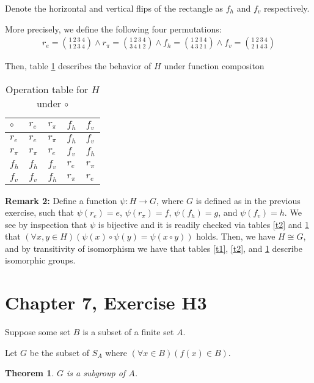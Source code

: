 \documentclass[12pt]{article}
\newtheorem{thm}{Theorem}
\begin{document}
Denote the horizontal and vertical flips
of the rectangle
as $f_h$ and $f_v$ respectively.

More precisely, we define the following four permutations:
\begin{align}
	r_e = \binom{1\ 2\ 3\ 4}{1\ 2\ 3\ 4} \land
	r_\pi = \binom{1\ 2\ 3\ 4}{3\ 4\ 1\ 2} \land
	f_h  = \binom{1\ 2\ 3\ 4}{4\ 3\ 2\ 1} \land
	f_v  = \binom{1\ 2\ 3\ 4}{2\ 1\ 4\ 3}
\end{align}

Then, table \ref{t3} describes the behavior of $H$
under function compositon

\begin{table}[!ht] 
\begin{tabular}{l|llll}
	$\circ$ & $r_e$ & $r_\pi$ & $f_h$ & $f_v$ \\ \hline
	$r_e$ & $r_e$ & $r_\pi$ & $f_h$ & $f_v$ \\
	$r_\pi$ & $r_\pi$ & $r_e$ & $f_v$ & $f_h$ \\
	$f_h$ & $f_h$ & $f_v$ & $r_e$ & $r_\pi$ \\
	$f_v$ & $f_v$ & $f_h$ & $r_\pi$ & $r_e$ \\
\end{tabular}
\centering
\caption{Operation table for $H$ under $\circ$}
\label{t3}
\end{table}


\textbf{Remark 2:} Define a function $\psi:H \to G$,
where $G$ is defined as in the previous exercise,
such that $\psi(r_e) = e$,
$\psi(r_\pi) = f$,
$\psi(f_h) = g$, and
$\psi(f_v) = h$.
We see by inspection that $\psi$ is bijective
and it is readily checked
via tables \ref{t2} and \ref{t3}
that $(\forall x,y \in H)(\psi(x) \circ \psi(y) = \psi(x \circ y))$ holds.
Then, we have $H \cong G$,
and by transitivity of isomorphism
we have that tables \ref{t1}, \ref{t2}, and \ref{t3}
describe isomorphic groups.

\section{Chapter 7, Exercise H3}

Suppose some set $B$ is a subset of a finite set $A$.

Let $G$ be the subset of $S_A$ where $(\forall x \in B)(f(x) \in B)$.

\begin{thm} \label{thm1}
	$G$ is a subgroup of $A$.
\end{thm}
\end{document}
